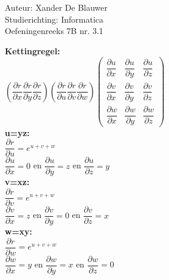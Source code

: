 \documentclass[a4paper]{article}
\begin{document}
\noindent \large Auteur: Xander De Blauwer \\
\noindent \large Studierichting: Informatica\\
\noindent \large Oefeningenreeks 7B nr. 3.1\\

\medskip

\normalsize

\textbf{Kettingregel:} \\
$\left(\dfrac{\partial r}{\partial x} \dfrac{\partial r}{\partial y} \dfrac{\partial r}{\partial z}\right)
\left(\dfrac{\partial r}{\partial u}  \dfrac{\partial r}{\partial v}  \dfrac{\partial r}{\partial w}\right)
\left(\begin{array}{ccc}
\dfrac{\partial u}{\partial x} & \dfrac{\partial u}{\partial y} & \dfrac{\partial u}{\partial z} \\
\dfrac{\partial v}{\partial x} & \dfrac{\partial v}{\partial y} & \dfrac{\partial v}{\partial z} \\
\dfrac{\partial w}{\partial x} & \dfrac{\partial w}{\partial y} & \dfrac{\partial w}{\partial z}
\end{array}\right)$ \\


\textbf{u=yz:} \\

$\dfrac{\partial r}{\partial u} = e^{u+v+w}$ \\

$\dfrac{\partial u}{\partial x} = 0 $ en $\dfrac{\partial u}{\partial y} = z$ en $\dfrac{\partial u}{\partial z} = y $ \\

\textbf{v=xz:} \\

$\dfrac{\partial r}{\partial v} = e^{u+v+w}$ \\

$\dfrac{\partial v}{\partial x} = z $ en $\dfrac{\partial v}{\partial y} = 0$ en $\dfrac{\partial v}{\partial z} = x $ \\

\textbf{w=xy:} \\

$\dfrac{\partial r}{\partial w} = e^{u+v+w}$ \\

$\dfrac{\partial w}{\partial x} = y $ en $\dfrac{\partial w}{\partial y} = x$ en $\dfrac{\partial w}{\partial z} = 0 $ \\
\end{document}
